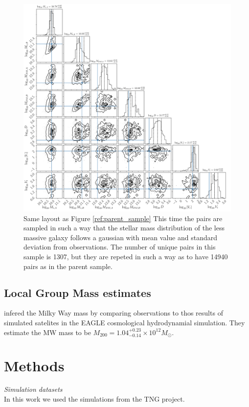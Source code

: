 \documentclass[fleqn,usenatbib]{mnras}
\begin{document}
\begin{figure}
\includegraphics[scale=0.4]{full_corner_L205n2500_star_mass_A.pdf}
\caption{\label{fig:prior_on_parent_sample}
Same layout as Figure \ref{ref:parent_sample}
This time the pairs are sampled in such a way that the stellar mass
distribution of the less massive galaxy follows a gaussian with mean
value and standard deviation from observations.
The number of unique pairs in this sample is 1307, but they are
repeted in such a way as to have 14940 pairs as in the parent sample.}
\end{figure}


\subsection{Local Group Mass estimates}

\citep{2018arXiv180810456C} infered the Milky Way mass by comparing
observations to thos results of simulated satelites in the EAGLE
cosmological hydrodynamial simulation. 
They estimate the MW mass to be $M_{200} =
1.04_{-0.14}^{+0.23}\times10^{12}M_{\odot}$. 
\section{Methods}
\textit{Simulation datasets}\\
In this work we used the simulations from the TNG project.
\end{document}
